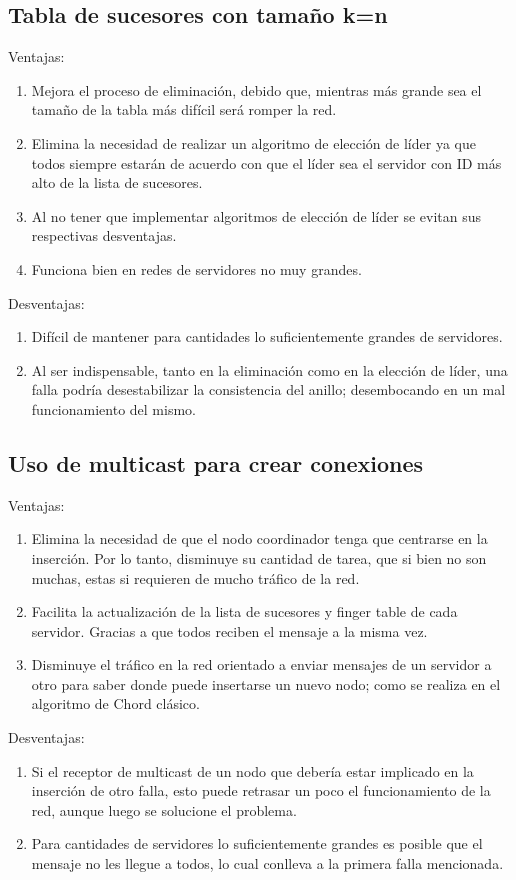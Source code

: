 \documentclass[10pt, a4paper]{article}
\begin{document}
    \subsection{Tabla de sucesores con tamaño k=n}
    Ventajas:
    \begin{enumerate}
    	\item Mejora el proceso de eliminación, debido que, mientras más grande sea el tamaño de la tabla más difícil será romper la red.
    	\item Elimina la necesidad de realizar un algoritmo de elección de líder ya que todos siempre estarán de acuerdo con que el líder sea el servidor con ID más alto de la lista de sucesores.
    	\item Al no tener que implementar algoritmos de elección de líder se evitan sus respectivas desventajas.
    	\item Funciona bien en redes de servidores no muy grandes.  	
    \end{enumerate}
    
    Desventajas:
    \begin{enumerate}
    	\item Difícil de mantener para cantidades lo suficientemente grandes de servidores.
    	\item Al ser indispensable, tanto en la eliminación como en la elección de líder, una falla podría desestabilizar la consistencia del anillo; desembocando en un mal funcionamiento del mismo.   	
    \end{enumerate}
    \subsection{Uso de multicast para crear conexiones}
    Ventajas:
    \begin{enumerate}
    	\item Elimina la necesidad de que el nodo coordinador tenga que centrarse en la inserción. Por lo tanto, disminuye su cantidad de tarea, que si bien no son muchas, estas si requieren de mucho tráfico de la red.
    	\item Facilita la actualización de la lista de sucesores y finger table de cada servidor. Gracias a que todos reciben el mensaje a la misma vez.
    	\item Disminuye el tráfico en la red orientado a enviar mensajes de un servidor a otro para saber donde puede insertarse un nuevo nodo; como se realiza en el algoritmo de Chord clásico.
    \end{enumerate}
    Desventajas:
    \begin{enumerate}
    	\item Si el receptor de multicast de un nodo que debería estar implicado en la inserción de otro falla, esto puede retrasar un poco el funcionamiento de la red, aunque luego se solucione el problema.
    	\item Para cantidades de servidores lo suficientemente grandes es posible que el mensaje no les llegue a todos, lo cual conlleva a la primera falla mencionada.
    \end{enumerate}
\end{document}
